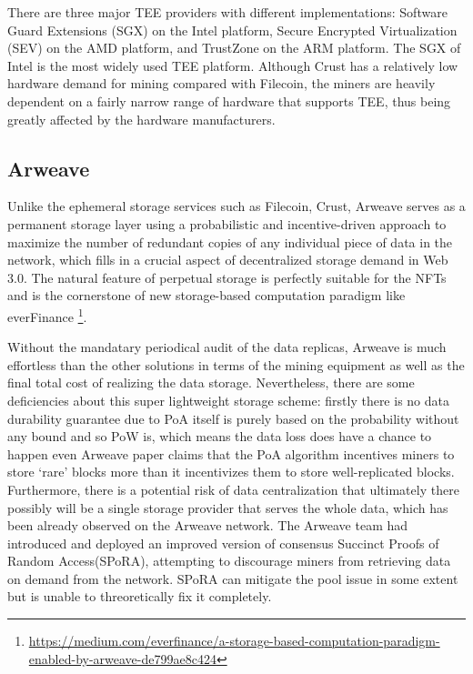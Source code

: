 \documentclass[]{article}
\begin{document}
There are three major TEE providers with different implementations: Software Guard Extensions (SGX) on the Intel platform, Secure Encrypted Virtualization (SEV) on the AMD platform, and TrustZone on the ARM platform. The SGX of Intel is the most widely used TEE platform. Although Crust has a relatively low hardware demand for mining compared with Filecoin, the miners are heavily dependent on a fairly narrow range of hardware that supports TEE, thus being greatly affected by the hardware manufacturers.



\subsection{Arweave}

Unlike the ephemeral storage services such as Filecoin, Crust, Arweave\cite{arweave} serves as a permanent storage layer using a probabilistic and incentive-driven approach to maximize the number of redundant copies of any individual piece of data in the network, which fills in a crucial aspect of decentralized storage demand in Web 3.0. The natural feature of perpetual storage is perfectly suitable for the NFTs and is the cornerstone of new storage-based computation paradigm like everFinance \footnote{\url{https://medium.com/everfinance/a-storage-based-computation-paradigm-enabled-by-arweave-de799ae8c424}}.

Without the mandatary periodical audit of the data replicas, Arweave is much effortless than the other solutions in terms of the mining equipment as well as the final total cost of realizing the data storage. Nevertheless, there are some deficiencies about this super lightweight storage scheme: firstly there is no data durability guarantee due to PoA itself is purely based on the probability without any bound and so PoW is, which means the data loss does have a chance to happen even Arweave paper claims that the PoA algorithm incentives miners to store ‘rare’ blocks more than it incentivizes them to store well-replicated blocks. Furthermore, there is a potential risk of data centralization that ultimately there possibly will be a single storage provider that serves the whole data, which has been already observed on the Arweave network. The Arweave team had introduced and deployed an improved version of consensus Succinct Proofs of Random Access(SPoRA), attempting to discourage miners from retrieving data on demand from the network. SPoRA can mitigate the pool issue in some extent but is unable to threoretically fix it completely.
\end{document}
